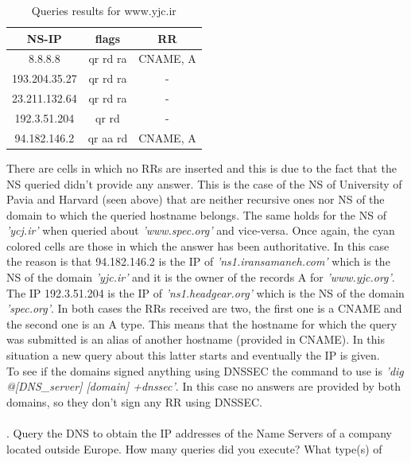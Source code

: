 \documentclass[a4paper,10pt]{article}
\begin{document}
\begin{multicols}{2}
        \begin{table}[H]
                \centering
                \caption{\small Queries results for www.yjc.ir}
                \vspace{0.3cm}
                \begin{tabular}{|c|c|c|}
                \hline
                \textbf{NS-IP} & \textbf{flags} & \textbf{RR} \\ \hline
                8.8.8.8 & qr rd ra & CNAME, A \\ \hline
                193.204.35.27 & qr rd ra & - \\ \hline
                23.211.132.64 & qr rd ra & - \\ \hline
                192.3.51.204 & qr rd & - \\ \hline
                94.182.146.2 & \cellcolor{cyan} qr aa rd & CNAME, A \\ \hline
                \end{tabular}
                \label{tab:quest_3_yjc}
        \end{table}
\noindent
There are cells in which no RRs are inserted and this is due to the fact that the NS queried didn't provide any answer. This is the case of the NS of University of Pavia and Harvard (seen above)
that are neither recursive ones nor NS of the domain to which the queried hostname belongs. The same holds for the NS of \textit{'ycj.ir'} when queried about \textit{'www.spec.org'} and vice-versa.
Once again, the cyan colored cells are those in which the answer has been authoritative. In this case the reason is that 94.182.146.2 is the IP of \textit{'ns1.iransamaneh.com'} which is the 
NS of the domain \textit{'yjc.ir'} and it is the owner of the records A for \textit{'www.yjc.org'}. The IP 192.3.51.204 is the IP of \textit{'ns1.headgear.org'} which is the NS of the domain
\textit{'spec.org'}. In both cases the RRs received are two, the first one is a CNAME and the second one is an A type. This means that the hostname for which the query was submitted is an alias
of another hostname (provided in CNAME). In this situation a new query about this latter starts and eventually the IP is given.\\
To see if the domains signed anything using DNSSEC the command to use is \textit{'dig @[DNS\_server] [domain] +dnssec'}. In this case no answers are provided by both domains, so they don't
sign any RR using DNSSEC.\\
\\
. Query the DNS to obtain the IP addresses of the Name Servers of a company located outside Europe. How many queries did you execute? What type(s) of 

\end{multicols}
\end{document}
